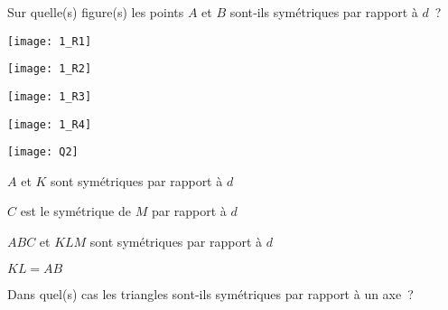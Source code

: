 

\begin{QCM}
  \begin{GroupeQCM}
    \begin{exercice}
      Sur quelle(s) figure(s) les points $A$ et $B$ sont‑ils symétriques par rapport à $d$ ?
      \begin{ChoixQCM}{4}
      \item 
      
      \texttt{[image: 1\_R1]}
      \item 
      
      \texttt{[image: 1\_R2]}
      \item 
      
      \texttt{[image: 1\_R3]}
      \item 
      
      \texttt{[image: 1\_R4]}
      \end{ChoixQCM}
\begin{corrige}
   \end{corrige}
    \end{exercice}
    
    
    \begin{exercice}
      \begin{center} \texttt{[image: Q2]} \end{center}
      \begin{ChoixQCM}{4}
      \item $A$ et $K$ sont symétriques par rapport à $d$
      \item $C$ est le symétrique de $M$ par rapport à $d$
      \item $ABC$ et $KLM$ sont symétriques par rapport à $d$
      \item $KL = AB$
      \end{ChoixQCM}
\begin{corrige}
   \end{corrige}
    \end{exercice}
    
    
    \begin{exercice}
      Dans quel(s) cas les triangles sont-ils symétriques par rapport à un axe ?
      \begin{ChoixQCM}{4}
      \item 
      

\end{ChoixQCM}
\end{exercice}
\end{GroupeQCM}
\end{QCM}
